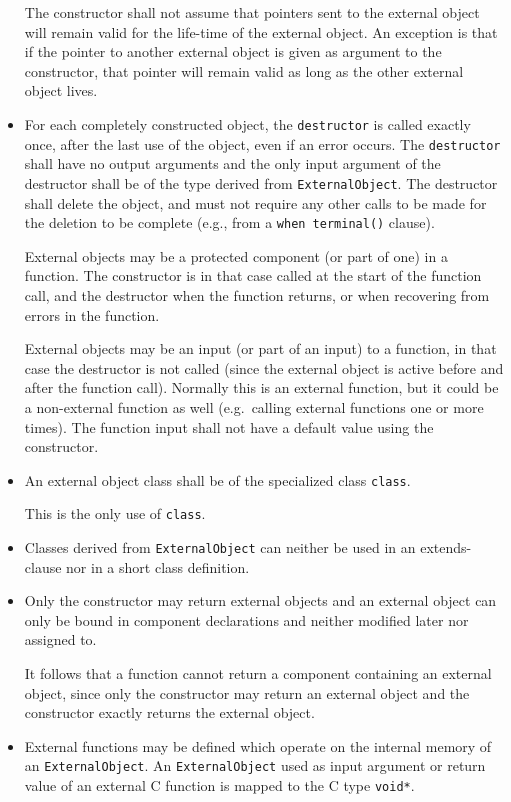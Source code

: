 \begin{itemize}
  The constructor shall not assume that pointers sent to the external object will remain valid for the life-time of the external object.
  An exception is that if the pointer to another external object is given as argument to the constructor, that pointer will remain valid as long as the other external object lives.
\item
  For each completely constructed object, the \lstinline!destructor! is called exactly once, after the last use of the object, even if an error occurs.
  The \lstinline!destructor! shall have no output arguments and the only input argument of the destructor shall be of the type derived from \lstinline!ExternalObject!.
  The destructor shall delete the object, and must not require any other calls to be made for the deletion to be complete (e.g., from a \lstinline!when terminal()! clause).
  \begin{nonnormative}
  External objects may be a protected component (or part of one) in a function.
  The constructor is in that case called at the start of the function call, and the destructor when the function returns, or when recovering from errors in the function.
  \end{nonnormative}
  \begin{nonnormative}
  External objects may be an input (or part of an input) to a function, in that case the destructor is not called (since the external object is active before and after the function call).
  Normally this is an external function, but it could be a non-external function as well (e.g.\ calling external functions one or more times).
  The function input shall not have a default value using the constructor.
  \end{nonnormative}
\item
  An external object class shall be of the specialized class \lstinline!class!.
  \begin{nonnormative}
  This is the only use of \lstinline!class!.
  \end{nonnormative}
\item
  Classes derived from \lstinline!ExternalObject! can neither be used in an
  extends-clause nor in a short class definition.
\item
  Only the constructor may return external objects and an external object
  can only be bound in component declarations and neither modified later
  nor assigned to.
  \begin{nonnormative}
  It follows that a function cannot return a component containing an external object, since only the constructor may return an external object and the constructor exactly returns the external object.
  \end{nonnormative}
\item
  External functions may be defined which operate on the internal memory
  of an \lstinline!ExternalObject!. An \lstinline!ExternalObject! used as input argument or
  return value of an external C function is mapped to the C type
  \lstinline!void*!.
\end{itemize}

